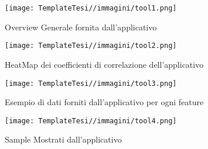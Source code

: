 \begin{figure}[H]
    \centering
    \texttt{[image: TemplateTesi//immagini/tool1.png]}
    \caption{Overview Generale fornita dall'applicativo}
    \label{fig:overviewapp}
\end{figure}
\begin{figure}
    \centering
    \texttt{[image: TemplateTesi//immagini/tool2.png]}
    \caption{HeatMap dei coefficienti di correlazione dell'applicativo}
    \label{fig:heatmapapp}
\end{figure}
\begin{figure}
    \centering
    \texttt{[image: TemplateTesi//immagini/tool3.png]}
    \caption{Esempio di dati forniti dall'applicativo per ogni feature}
    \label{fig:datiapp}
\end{figure}
\begin{figure}
    \centering
    \texttt{[image: TemplateTesi//immagini/tool4.png]}
    \caption{Sample Mostrati dall'applicativo}
    \label{fig:sampleapp}
\end{figure}